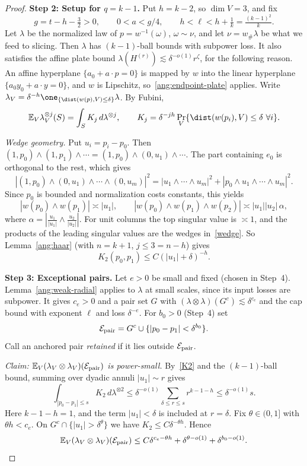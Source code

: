 \begin{proof}
\textbf{Step 2: Setup for $q=k-1$.} Put $h=k-2$, so $\dim V=3$, and fix
\[
 g=t-h-\tfrac32>0,\qquad 0<a<g/4,\qquad h<\ell<h+\tfrac1k=\tfrac{(k-1)^2}{k}.
\]
Let $\lambda$ be the normalized law of $p=w^{-1}(\omega)$, $\omega\sim\nu$, and let $\nu=w_\#\lambda$ be what we feed to slicing. Then $\lambda$ has $(k-1)$-ball bounds with subpower loss. It also satisfies the affine plate bound $\lambda(H^{(r)})\lesssim\delta^{-o(1)}r^\zeta$, for the following reason. An affine hyperplane $\{a_0+a\cdot p=0\}$ is mapped by $w$ into the linear hyperplane $\{a_0y_0+a\cdot y=0\}$, and $w$ is Lipschitz, so~\eqref{ang:endpoint-plate} applies. Write $\lambda_V=\delta^{-h}\one_{\{\dist(w(p),V)\le\delta\}}\lambda$. By Fubini,
\[
 \mathbb E_V\lambda_V^{\otimes j}(S)=\int_S K_j\,d\lambda^{\otimes j},\qquad
 K_j=\delta^{-jh}\Pr_V\{\dist(w(p_i),V)\le\delta\ \forall i\}.
\]

\emph{Wedge geometry.} Put $u_i=p_i-p_0$. Then $(1,p_0)\wedge(1,p_1)\wedge\cdots=(1,p_0)\wedge(0,u_1)\wedge\cdots$. The part containing $e_0$ is orthogonal to the rest, which gives
\[
|(1,p_0)\wedge(0,u_1)\wedge\cdots\wedge(0,u_m)|^2=|u_1\wedge\cdots\wedge u_m|^2+|p_0\wedge u_1\wedge\cdots\wedge u_m|^2 .
\]
Since $p_0$ is bounded and normalization costs constants, this yields
\begin{equation}\label{wedge}
 |w(p_0)\wedge w(p_1)|\asymp|u_1|,\qquad |w(p_0)\wedge w(p_1)\wedge w(p_2)|\asymp|u_1||u_2|\,\alpha,
\end{equation}
where $\alpha=|\tfrac{u_1}{|u_1|}\wedge\tfrac{u_2}{|u_2|}|$. For unit columns the top singular value is $\asymp1$, and the products of the leading singular values are the wedges in~\eqref{wedge}. So Lemma~\ref{ang:haar} (with $n=k+1$, $j\le3=n-h$) gives
\begin{equation}\label{K2}
K_2(p_0,p_1)\le C(|u_1|+\delta)^{-h}.
\end{equation}

\textbf{Step 3: Exceptional pairs.} Let $e>0$ be small and fixed (chosen in Step~4). Lemma~\ref{ang:weak-radial} applies to $\lambda$ at small scales, since its input losses are subpower. It gives $c_e>0$ and a pair set $G$ with $(\lambda\otimes\lambda)(G^c)\lesssim\delta^{c_e}$ and the cap bound with exponent $\ell$ and loss $\delta^{-e}$. For $b_0>0$ (Step~4) set
\[
\mathcal E_{\rm pair}=G^c\cup\{|p_0-p_1|<\delta^{b_0}\}.
\]
Call an anchored pair \emph{retained} if it lies outside $\mathcal E_{\rm pair}$.

\emph{Claim: $\mathbb E_V(\lambda_V\otimes\lambda_V)(\mathcal E_{\rm pair})$ is power-small.} By~\eqref{K2} and the $(k-1)$-ball bound, summing over dyadic annuli $|u_1|\sim r$ gives
\[
\int_{|p_0-p_1|\le s}K_2\,d\lambda^{\otimes2}\le\delta^{-o(1)}\sum_{\delta\le r\le s}r^{k-1-h}\le\delta^{-o(1)}s .
\]
Here $k-1-h=1$, and the term $|u_1|<\delta$ is included at $r=\delta$. Fix $\theta\in(0,1]$ with $\theta h<c_e$. On $G^c\cap\{|u_1|>\delta^\theta\}$ we have $K_2\le C\delta^{-\theta h}$. Hence
\[
\mathbb E_V(\lambda_V\otimes\lambda_V)(\mathcal E_{\rm pair})\le C\delta^{c_e-\theta h}+\delta^{\theta-o(1)}+\delta^{b_0-o(1)}.
\]


\end{proof}
